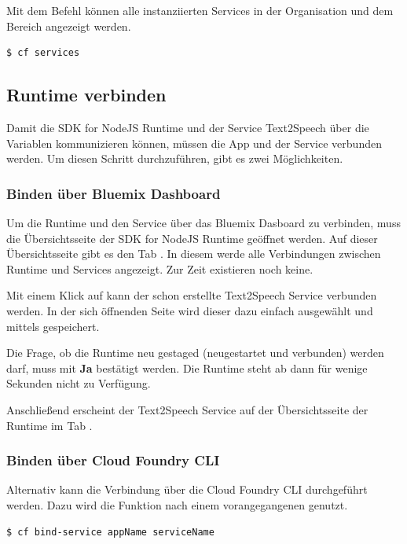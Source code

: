 Mit dem Befehl  können alle instanziierten Services in der Organisation und dem Bereich angezeigt werden.

\begin{lstlisting}[language=bash, caption=Auflisten aller instanziieren Services, label=Auflisten aller instantiieren Services]
   $ cf services
\end{lstlisting}

\subsection{Runtime verbinden}
Damit die SDK for NodeJS Runtime und der Service Text2Speech über die  Variablen kommunizieren können, müssen
die App und der Service verbunden werden. Um diesen Schritt durchzuführen, gibt es zwei Möglichkeiten.

\subsubsection{Binden über Bluemix Dashboard}
Um die Runtime und den Service über das Bluemix Dasboard zu verbinden, muss die Übersichtsseite der SDK for NodeJS Runtime
geöffnet werden. Auf dieser Übersichtsseite gibt es den Tab . In diesem werde alle Verbindungen zwischen
Runtime und Services angezeigt. Zur Zeit existieren noch keine.

Mit einem Klick auf  kann der schon erstellte Text2Speech Service verbunden werden. In der sich
öffnenden Seite wird dieser dazu einfach ausgewählt und mittels  gespeichert.

Die Frage, ob die Runtime neu gestaged (neugestartet und verbunden) werden darf, muss mit \textbf{Ja} bestätigt werden.
Die Runtime steht ab dann für wenige Sekunden nicht zu Verfügung.

Anschließend erscheint der Text2Speech Service auf der Übersichtsseite der Runtime im Tab .

\subsubsection{Binden über Cloud Foundry CLI}
Alternativ kann die Verbindung über die Cloud Foundry CLI durchgeführt werden. Dazu wird die Funktion 
nach einem vorangegangenen  genutzt.

\begin{lstlisting}[language=bash, caption=Binden der Runtime mit dem Service, label=Binden der Runtime mit dem Service]
   $ cf bind-service appName serviceName
\end{lstlisting}

